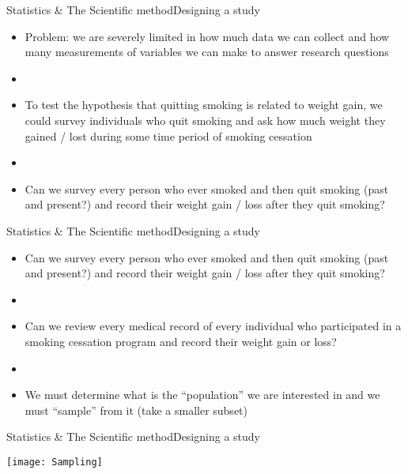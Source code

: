 \documentclass[xcolor=dvipsnames]{beamer}
\begin{document}
\begin{frame}{Statistics \& The Scientific method}{Designing a study}
	\vspace{-12pt}
	\begin{itemize}
		\item Problem: we are severely limited in how much data we can collect and how many measurements of variables we can make to answer research questions \pause
		\item[]
		\item To test the hypothesis that quitting smoking is related to weight gain, we could survey individuals who quit smoking and ask how much weight they gained / lost during some time period of smoking cessation \pause
		\item[]
		\item Can we survey every person who ever smoked and then quit smoking (past and present?) and record their weight gain / loss after they quit smoking?
	\end{itemize}
\end{frame}

\begin{frame}{Statistics \& The Scientific method}{Designing a study}
	\begin{itemize}
		\item Can we survey every person who ever smoked and then quit smoking (past and present?) and record their weight gain / loss after they quit smoking? \pause
		\item[]
		\item Can we review every medical record of every individual who participated in a smoking cessation program and record their weight gain or loss? \pause
		\item[]
		\item We must determine what is the ``population'' we are interested in and we must ``sample'' from it (take a smaller subset)
	\end{itemize}
\end{frame}

\begin{frame}{Statistics \& The Scientific method}{Designing a study}
	\vspace{-12pt}
	\begin{center}
		\texttt{[image: Sampling]}
	\end{center}
\end{frame}
\end{document}
